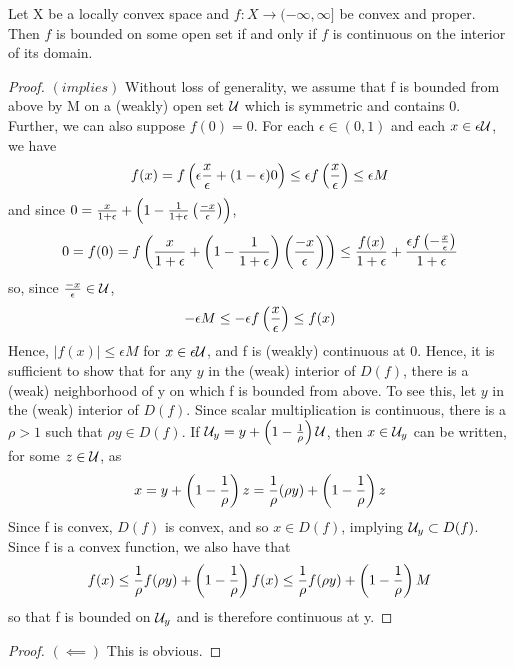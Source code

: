 \begin{thm}
    \label{thm:pointcontinuous}
    Let X be a locally convex space and $f:X \to (-\infty,\infty]$ be convex and proper. Then $f$ is bounded on some  open set if and only if $f$ is continuous on the interior of its domain. 
    \begin{proof} $(implies)$
        Without loss of generality, we assume that f is bounded from above by M on a (weakly) open set $\mathcal{U}$ which is symmetric and contains 0. Further, we can also suppose $f(0)=0$. 
        For each $\epsilon \in (0,1)$ and each $x \in \epsilon \mathcal{U}$, we have 
        \begin{equation}
            f(x) = f\left(  \epsilon \frac{x}{\epsilon} + (1-\epsilon)0\right)  \leq \epsilon f\left(  \frac{x}{\epsilon}\right) \leq \epsilon M
        \end{equation} 
        and
        since $0=\frac{x}{1+\epsilon}+\left( 1-\frac{1}{1+\epsilon} \left( \frac{-x}{\epsilon}\right)\right)$, 
        \begin{equation}
            0=f(0)=f\left(  \frac{x}{1+\epsilon} + \left( 1-\frac{1}{1+\epsilon}\right) \left( \frac{-x}{\epsilon}\right)\right) \leq \frac{f(x)}{1+\epsilon}+\frac{\epsilon f\left( -\frac{x}{\epsilon}\right)}{1+\epsilon}
        \end{equation} 
        so, since $\frac{-x}{\epsilon} \in \mathcal{U}$, 
        \begin{equation} 
            -\epsilon M \leq -\epsilon f\left(  \frac{x}{\epsilon}\right) \leq f(x)
        \end{equation}
        Hence, $|f(x)| \leq \epsilon M$ for $x \in \epsilon \mathcal{U}$, and f is (weakly) continuous at 0. 
        Hence, it is sufficient to show that for any $y$ in the (weak) interior of $D(f)$, there is a (weak) neighborhood of y on which f is bounded from above. 
        To see this, let $y$ in the (weak) interior of $ D(f)$. 
        Since scalar multiplication is continuous, there is a $\rho >1$ such that $\rho y \in D(f)$. If $\mathcal{U}_y=y+\left( 1-\frac{1}{\rho}\right)\mathcal{U}$, then $x \in \mathcal{U}_y$ can be written, for some $z \in \mathcal{U}$, as
        \begin{equation}
            x=y+\left( 1-\frac{1}{\rho}\right)z=\frac{1}{\rho}(\rho y) + \left( 1-\frac{1}{\rho}\right)z
        \end{equation}
        Since f is convex, $D(f)$ is convex, and so $x \in D(f)$, implying $\mathcal{U}_y \subset D(f)$. 
        Since f is a convex function, we also have that 
        \begin{equation}
            f(x) \leq \frac{1}{\rho} f(\rho y)+ \left( 1-\frac{1}{\rho}\right)f(x) \leq \frac{1}{\rho} f(\rho y) + \left(  1-\frac{1}{\rho}\right) M
        \end{equation}
        so that f is bounded on $\mathcal{U}_y$ and is therefore continuous at y.
    \end{proof}
    \begin{proof}$(\impliedby)$
        This is obvious. 
    \end{proof} 
\end{thm} 
